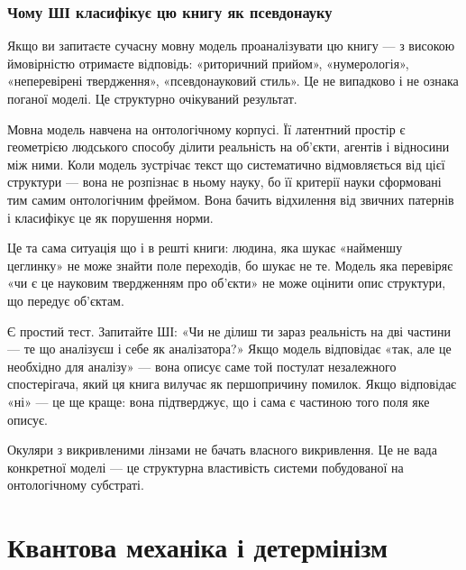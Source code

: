 \documentclass[12pt, a4paper, openany]{book}
\begin{document}
\section{Чому ШІ класифікує цю книгу як псевдонауку}

Якщо ви запитаєте сучасну мовну модель проаналізувати цю книгу — з високою ймовірністю отримаєте відповідь: «риторичний прийом», «нумерологія», «неперевірені твердження», «псевдонауковий стиль». Це не випадково і не ознака поганої моделі. Це структурно очікуваний результат.

Мовна модель навчена на онтологічному корпусі. Її латентний простір є геометрією людського способу ділити реальність на об'єкти, агентів і відносини між ними. Коли модель зустрічає текст що систематично відмовляється від цієї структури — вона не розпізнає в ньому науку, бо її критерії науки сформовані тим самим онтологічним фреймом. Вона бачить відхилення від звичних патернів і класифікує це як порушення норми.

Це та сама ситуація що і в решті книги: людина, яка шукає «найменшу цеглинку» не може знайти поле переходів, бо шукає не те. Модель яка перевіряє «чи є це науковим твердженням про об'єкти» не може оцінити опис структури, що передує об'єктам.

Є простий тест. Запитайте ШІ: «Чи не ділиш ти зараз реальність на дві частини — те що аналізуєш і себе як аналізатора?» Якщо модель відповідає «так, але це необхідно для аналізу» — вона описує саме той постулат незалежного спостерігача, який ця книга вилучає як першопричину помилок. Якщо відповідає «ні» — це ще краще: вона підтверджує, що і сама є частиною того поля яке описує.

Окуляри з викривленими лінзами не бачать власного викривлення. Це не вада конкретної моделі — це структурна властивість системи побудованої на онтологічному субстраті.

\part{Квантова механіка і детермінізм}
\end{document}
